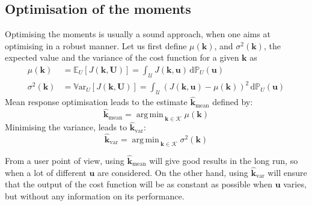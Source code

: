 \documentclass[npg, manuscript]{copernicus}
\DeclareMathOperator*{\argmin}{arg\,min \,}
\newcommand{\Var}{\mathbb{V}\textrm{ar}}
\newcommand{\Ex}{\mathbb{E}}
\newcommand{\Prob}{\mathbb{P}}
\newcommand{\kmean}{\hat{\mathbf{k}}_{\mathrm{mean}}}
\begin{document}
\begin{itemize}
\end{itemize}


\subsection{Optimisation of the moments}
Optimising the moments is usually a sound approach, when one aims at optimising in a robust manner. Let us first define $\mu(\mathbf{k})$, and $\sigma^2(\mathbf{k})$, the expected value and the variance of the cost function for a given $\mathbf{k}$ as
\begin{align}
  \label{eq:def_mu}
  \mu(\mathbf{k}) &= \Ex_U\left[J(\mathbf{k},\mathbf{U})\right] = \int_{\mathcal{U}} J(\mathbf{k},\mathbf{u}) \, \mathrm{d}\Prob_U(\mathbf{u}) \\
  \label{eq:def_sigma2}
  \sigma^2(\mathbf{k}) &= \Var_U\left[J(\mathbf{k},\mathbf{U})\right] = \int_{\mathcal{U}} \left(J(\mathbf{k},\mathbf{u}) - \mu(\mathbf{k})\right)^2 \, \mathrm{d}\Prob_U(\mathbf{u}) 
\end{align}
Mean response optimisation leads to the estimate $\kmean$ defined by:
\begin{equation}
  \label{eq:stoch_opt_def_mean}
  \kmean = \argmin_{\mathbf{k}\in\mathcal{K}} \mu(\mathbf{k})
\end{equation}
Minimising the variance, leads to $\hat{\mathbf{k}}_{\mathrm{var}}$:
\begin{equation}
  \label{eq:stoch_opt_def_var}
  \hat{\mathbf{k}}_{\mathrm{var}} = \argmin_{\mathbf{k} \in \mathcal{K}} \sigma^2(\mathbf{k})
\end{equation}


From a user point of view, using $\kmean$ will give good results in the long run, so when a lot of different $\mathbf{u}$ are considered. On the other hand, using $\hat{\mathbf{k}}_{\mathrm{var}}$ will ensure that the output of the cost function will be as constant as possible when $\mathbf{u}$ varies, but without any information on its performance.
\end{document}

